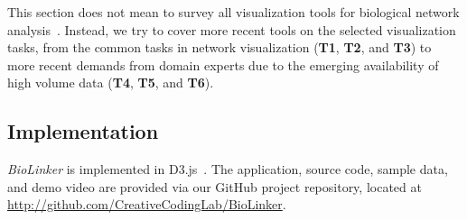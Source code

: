\documentclass[journal]{vgtc}                %
\newcommand{\theName}{\textit{BioLinker}}
\begin{document}
This section does not mean to survey all visualization tools for biological network analysis~\cite{Suderman2007Tools,Pavlopoulos2008Survey,Huang2009Bioinformatics}. Instead, we try to cover more recent tools on the selected visualization tasks, from the common tasks in network visualization (\textbf{T1}, \textbf{T2}, and \textbf{T3}) to more recent demands from domain experts due to the emerging availability of high volume data (\textbf{T4}, \textbf{T5}, and \textbf{T6}). 


\subsection{Implementation}

\theName{} is implemented in D3.js~\cite{Bostock2011D3}. The application, source code, sample data, and demo video are provided via our GitHub project repository, located at \url{http://github.com/CreativeCodingLab/BioLinker}.












%
%
%
%

\end{document}
